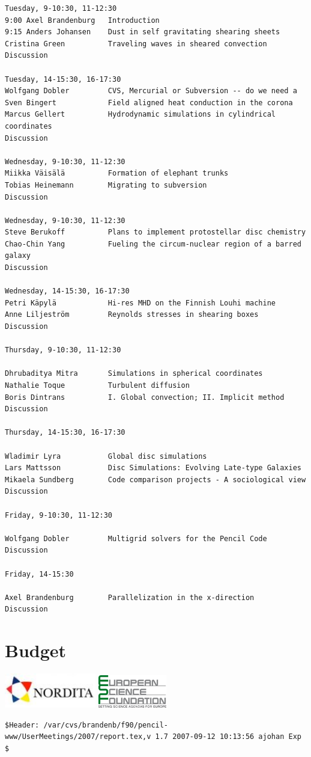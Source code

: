 \documentclass{article}
\begin{document}
\begin{verbatim}
Tuesday, 9-10:30, 11-12:30
9:00 Axel Brandenburg   Introduction
9:15 Anders Johansen    Dust in self gravitating shearing sheets
Cristina Green          Traveling waves in sheared convection
Discussion

Tuesday, 14-15:30, 16-17:30
Wolfgang Dobler         CVS, Mercurial or Subversion -- do we need a
Sven Bingert            Field aligned heat conduction in the corona
Marcus Gellert          Hydrodynamic simulations in cylindrical coordinates
Discussion

Wednesday, 9-10:30, 11-12:30
Miikka Väisälä          Formation of elephant trunks
Tobias Heinemann        Migrating to subversion
Discussion

Wednesday, 9-10:30, 11-12:30
Steve Berukoff          Plans to implement protostellar disc chemistry
Chao-Chin Yang          Fueling the circum-nuclear region of a barred galaxy
Discussion

Wednesday, 14-15:30, 16-17:30
Petri Käpylä            Hi-res MHD on the Finnish Louhi machine
Anne Liljeström         Reynolds stresses in shearing boxes
Discussion

Thursday, 9-10:30, 11-12:30

Dhrubaditya Mitra       Simulations in spherical coordinates
Nathalie Toque          Turbulent diffusion
Boris Dintrans          I. Global convection; II. Implicit method
Discussion

Thursday, 14-15:30, 16-17:30

Wladimir Lyra           Global disc simulations
Lars Mattsson           Disc Simulations: Evolving Late-type Galaxies
Mikaela Sundberg        Code comparison projects - A sociological view
Discussion

Friday, 9-10:30, 11-12:30

Wolfgang Dobler         Multigrid solvers for the Pencil Code
Discussion

Friday, 14-15:30

Axel Brandenburg        Parallelization in the x-direction
Discussion
\end{verbatim}

\section{Budget}

\includegraphics[width=4cm]{140px-Logo-a}
\includegraphics[width=3cm]{logo_esf}

\vfill\bigskip\noindent\tiny\begin{verbatim}
$Header: /var/cvs/brandenb/f90/pencil-www/UserMeetings/2007/report.tex,v 1.7 2007-09-12 10:13:56 ajohan Exp $
\end{verbatim}
\end{document}
